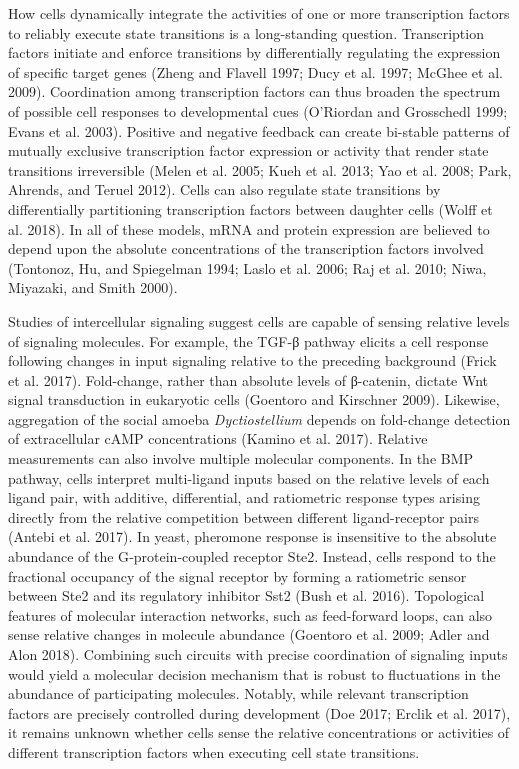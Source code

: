 How cells dynamically integrate the activities of one or more transcription factors to reliably execute state transitions is a long-standing question. Transcription factors initiate and enforce transitions by differentially regulating the expression of specific target genes (Zheng and Flavell 1997; Ducy et al. 1997; McGhee et al. 2009). Coordination among transcription factors can thus broaden the spectrum of possible cell responses to developmental cues (O'Riordan and Grosschedl 1999; Evans et al. 2003). Positive and negative feedback can create bi-stable patterns of mutually exclusive transcription factor expression or activity that render state transitions irreversible (Melen et al. 2005; Kueh et al. 2013; Yao et al. 2008; Park, Ahrends, and Teruel 2012). Cells can also regulate state transitions by differentially partitioning transcription factors between daughter cells (Wolff et al. 2018). In all of these models, mRNA and protein expression are believed to depend upon the absolute concentrations of the transcription factors involved (Tontonoz, Hu, and Spiegelman 1994; Laslo et al. 2006; Raj et al. 2010; Niwa, Miyazaki, and Smith 2000).

Studies of intercellular signaling suggest cells are capable of sensing relative levels of signaling molecules. For example, the TGF-β pathway elicits a cell response following changes in input signaling relative to the preceding background (Frick et al. 2017). Fold-change, rather than absolute levels of β-catenin, dictate Wnt signal transduction in eukaryotic cells (Goentoro and Kirschner 2009). Likewise, aggregation of the social amoeba \emph{Dyctiostellium} depends on fold-change detection of extracellular cAMP concentrations (Kamino et al. 2017). Relative measurements can also involve multiple molecular components. In the BMP pathway, cells interpret multi-ligand inputs based on the relative levels of each ligand pair, with additive, differential, and ratiometric response types arising directly from the relative competition between different ligand-receptor pairs (Antebi et al. 2017). In yeast, pheromone response is insensitive to the absolute abundance of the G‐protein‐coupled receptor Ste2. Instead, cells respond to the fractional occupancy of the signal receptor by forming a ratiometric sensor between Ste2 and its regulatory inhibitor Sst2 (Bush et al. 2016). Topological features of molecular interaction networks, such as feed-forward loops, can also sense relative changes in molecule abundance (Goentoro et al. 2009; Adler and Alon 2018). Combining such circuits with precise coordination of signaling inputs would yield a molecular decision mechanism that is robust to fluctuations in the abundance of participating molecules. Notably, while relevant transcription factors are precisely controlled during development (Doe 2017; Erclik et al. 2017), it remains unknown whether cells sense the relative concentrations or activities of different transcription factors when executing cell state transitions.

